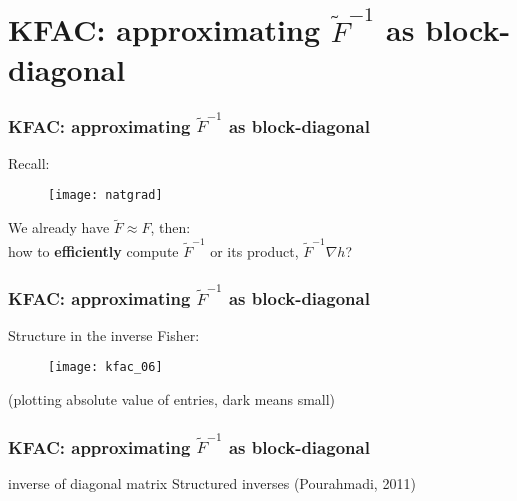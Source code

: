 \section{KFAC: approximating $\tilde{F}^{-1}$ as block-diagonal}

\begin{frame}
\frametitle{KFAC: approximating $\tilde{F}^{-1}$ as block-diagonal}
Recall:
\begin{figure}
    \centering
    \texttt{[image: natgrad]}
\end{figure}

We already have $\tilde{F} \approx F$, then: \\
how to \textbf{efficiently} compute $\tilde{F}^{-1}$ or its product, $\tilde{F}^{-1}\nabla h$?
\end{frame}

\begin{frame}
\frametitle{KFAC: approximating $\tilde{F}^{-1}$ as block-diagonal}
Structure in the inverse Fisher:
\begin{figure}
    \centering
    \texttt{[image: kfac\_06]}
\end{figure}
(plotting absolute value of entries, dark means small)
\end{frame}

\begin{frame}
\frametitle{KFAC: approximating $\tilde{F}^{-1}$ as block-diagonal}
inverse of diagonal matrix
Structured inverses (Pourahmadi, 2011)

\end{frame}
